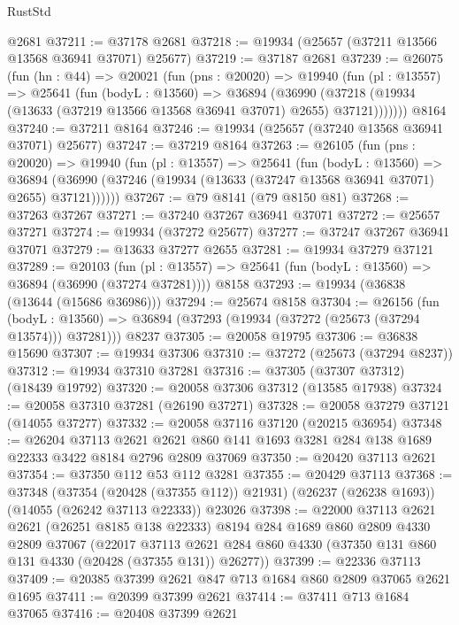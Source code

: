 \begin{lexlean}{RustStd}
\begin{coremodule}
    @2681
@37211 := @37178 @2681
@37218 := @19934 (@25657 (@37211 @13566 @13568 @36941 @37071) @25677)
@37219 := @37187 @2681
@37239 := @26075
    (fun (hn : @44) =>
    @20021
      (fun (pns : @20020) =>
      @19940
        (fun (pl : @13557) =>
        @25641
          (fun (bodyL : @13560) =>
          @36894
            (@36990
              (@37218 (@19934 (@13633 (@37219 @13566 @13568 @36941 @37071) @2655) @37121)))))))
    @8164
@37240 := @37211 @8164
@37246 := @19934 (@25657 (@37240 @13568 @36941 @37071) @25677)
@37247 := @37219 @8164
@37263 := @26105
    (fun (pns : @20020) =>
    @19940
      (fun (pl : @13557) =>
      @25641
        (fun (bodyL : @13560) =>
        @36894 (@36990 (@37246 (@19934 (@13633 (@37247 @13568 @36941 @37071) @2655) @37121))))))
@37267 := @79 @8141 (@79 @8150 @81)
@37268 := @37263 @37267
@37271 := @37240 @37267 @36941 @37071
@37272 := @25657 @37271
@37274 := @19934 (@37272 @25677)
@37277 := @37247 @37267 @36941 @37071
@37279 := @13633 @37277 @2655
@37281 := @19934 @37279 @37121
@37289 := @20103
    (fun (pl : @13557) => @25641 (fun (bodyL : @13560) => @36894 (@36990 (@37274 @37281))))
    @8158
@37293 := @19934 (@36838 (@13644 (@15686 @36986)))
@37294 := @25674 @8158
@37304 := @26156
    (fun (bodyL : @13560) => @36894 (@37293 (@19934 (@37272 (@25673 (@37294 @13574))) @37281)))
    @8237
@37305 := @20058 @19795
@37306 := @36838 @15690
@37307 := @19934 @37306
@37310 := @37272 (@25673 (@37294 @8237))
@37312 := @19934 @37310 @37281
@37316 := @37305 (@37307 @37312) (@18439 @19792)
@37320 := @20058 @37306 @37312 (@13585 @17938)
@37324 := @20058 @37310 @37281 (@26190 @37271)
@37328 := @20058 @37279 @37121 (@14055 @37277)
@37332 := @20058 @37116 @37120 (@20215 @36954)
@37348 := @26204
    @37113
    @2621
    @2621
    @860
    @141
    @1693
    @3281
    @284
    @138
    @1689
    @22333
    @3422
    @8184
    @2796
    @2809
    @37069
@37350 := @20420 @37113 @2621
@37354 := @37350 @112 @53 @112 @3281
@37355 := @20429 @37113
@37368 := @37348
    (@37354 (@20428 (@37355 @112)) @21931)
    (@26237 (@26238 @1693))
    (@14055 (@26242 @37113 @22333))
    @23026
@37398 := @22000
    @37113
    @2621
    @2621
    (@26251 @8185 @138 @22333)
    @8194
    @284
    @1689
    @860
    @2809
    @4330
    @2809
    @37067
    (@22017
      @37113
      @2621
      @284
      @860
      @4330
      (@37350 @131 @860 @131 @4330 (@20428 (@37355 @131)) @26277))
@37399 := @22336 @37113
@37409 := @20385 @37399 @2621 @847 @713 @1684 @860 @2809 @37065 @2621 @1695
@37411 := @20399 @37399 @2621
@37414 := @37411 @713 @1684 @37065
@37416 := @20408 @37399 @2621

\end{coremodule}
\end{lexlean}
